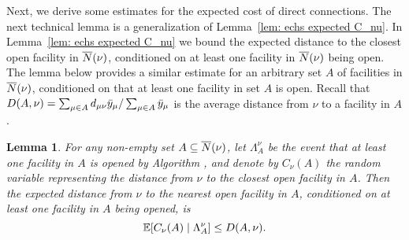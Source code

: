 \documentclass[oneside,final]{ucr}
\newtheorem{lemma}[theorem]{Lemma}
\begin{document}
Next, we derive some estimates for the expected cost of direct
connections.  The next technical lemma is a generalization of
Lemma~\ref{lem: echs expected C_nu}. In Lemma~\ref{lem: echs expected
  C_nu} we bound the expected distance to the closest open facility in
${\overline{N}}(\nu)$, conditioned on at least one facility in ${\overline{N}}(\nu)$
being open. The lemma below provides a similar estimate for an
arbitrary set $A$ of facilities in ${\overline{N}}(\nu)$, conditioned on that
at least one facility in set $A$ is open.  Recall that $D(A,\nu) =
\sum_{\mu \in A} d_{\mu\nu} {\bar y}_{\mu} / \sum_{\mu \in A}
{\bar y}_{\mu}$ is the average distance from $\nu$ to a facility in $A$. 


\begin{lemma}\label{lem: expected distance in EBGS}
  For any non-empty set $A\subseteq {\overline{N}}(\nu)$, let $\Lambda^\nu_A$ be
  the event that at least one facility in $A$ is opened by Algorithm
  {\EBGS}, and denote by $C_\nu(A)$ the random variable representing
  the distance from $\nu$ to the closest open facility in $A$.  Then
  the expected distance from $\nu$ to the nearest open facility in
  $A$, conditioned on at least one facility in $A$ being opened, is
%
\begin{equation*}
	\mathbb{E}[C_\nu(A) \mid \Lambda^\nu_A ] \le D(A,\nu).
\end{equation*}
\end{lemma}
\end{document}
